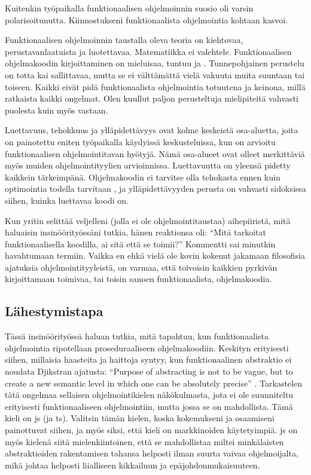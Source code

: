Kuitenkin työpaikalla funktionaalisen ohjelmoinnin suosio oli varsin polarisoitunutta. Kiinnostukseni funktionaalista ohjelmointia kohtaan kasvoi.

Funktionaalisen ohjelmoinnin taustalla oleva teoria on kiehtovaa, perustavanlaatuista ja luotettavaa. Matematiikka ei valehtele. Funktionaalisen ohjelmakoodin kirjoittaminen on mieluisaa, tuntuu  ja . Tunnepohjainen perustelu on totta kai sallittavaa, mutta se ei välttämättä vielä vakuuta muita suuntaan tai toiseen. Kaikki eivät pidä funktionaalista ohjelmointia totuutena ja keinona, millä ratkaista kaikki ongelmat. Olen kuullut paljon perusteltuja mielipiteitä vahvasti  puolesta kuin myös vastaan.

Luettavuus, tehokkuus ja ylläpidettävyys ovat kolme keskeistä osa-aluetta, joita on painotettu eniten työpaikalla käydyissä keskusteluissa, kun on arvioitu funktionaalisen ohjelmointitavan hyötyjä. Nämä osa-alueet ovat olleet merkittäviä myös muiden ohjelmointityylien arvioinnissa. Luettavuutta on yleensä pidetty kaikkein tärkeimpänä. Ohjelmakoodin ei tarvitse olla tehokasta ennen kuin optimointia todella tarvitaan \cite{prematureoptimization}, ja ylläpidettävyyden perusta on vahvasti sidoksissa siihen, kuinka luettavaa koodi on.

Kun yritin selittää veljelleni (jolla ei ole ohjelmointitaustaa) aihepiiristä, mitä haluaisin insinöörityössäni tutkia, hänen reaktionsa oli: \enquote{Mitä tarkoitat funktionaalisella koodilla, ai sitä että se toimii?} Kommentti sai minutkin havahtumaan termiin. Vaikka en ehkä vielä ole kovin kokenut jakamaan filosofisia ajatuksia ohjelmointityyleistä, on varmaa, että toivoisin kaikkien pyrkivän kirjoittamaan toimivaa, tai toisin sanoen funktionaalista, ohjelmakoodia.

\subsection{Lähestymistapa}

Tässä insinöörityössä haluan tutkia, mitä tapahtuu, kun funktionaalista ohjelmointia ripotellaan proseduraaliseen ohjelmakoodiin. Keskityn erityisesti siihen, millaisia haasteita ja haittoja syntyy, kun funktionaalinen abstraktio ei noudata Djikstran ajatusta: \enquote{Purpose of abstracting is not to be vague, but to create a new semantic level in which one can be absolutely precise} \cite{dijkstra_humble_programmer}. Tarkastelen tätä ongelmaa sellaisen ohjelmointikielen näkökulmasta, jota ei ole suunniteltu erityisesti funktionaaliseen ohjelmointiin, mutta jossa se on mahdollista. Tämä kieli on \gls{js} (ja \gls{ts}). Valitsin tämän kielen, koska kokemukseni ja osaamiseni painottuvat siihen, ja myös siksi, että kieli on markkinoiden käytetyimpiä. \Gls{js} on myös kielenä siitä mielenkiintoinen, että se mahdollistaa miltei minkälaisten abstraktioiden rakentamisen tahansa helposti ilman suurta vaivaa ohjelmoijalta, mikä johtaa helposti liialliseen kikkailuun ja epäjohdonmukaisuuteen.

